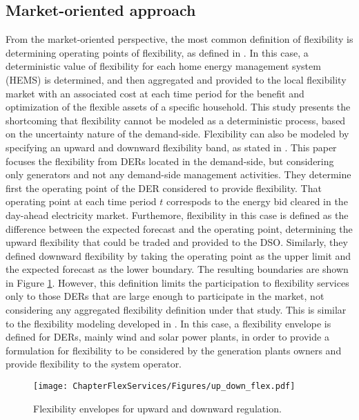 \subsection{Market-oriented approach}
From the market-oriented perspective, the most common definition of flexibility is determining operating points of flexibility, as defined in \cite{Olivella-Rosell2018}. In this case, a deterministic value of flexibility for each home energy management system (HEMS) is determined, and then aggregated and provided to the local flexibility market with an associated cost at each time period for the benefit and optimization of the flexible assets of a specific household. This study presents the shortcoming that flexibility cannot be modeled as a deterministic process, based on the uncertainty nature of the demand-side. Flexibility can also be modeled by specifying an upward and downward flexibility band, as stated in \cite{Soares2017}. This paper focuses the flexibility from DERs located in the demand-side, but considering only generators and not any demand-side management activities. They determine first the operating point of the DER considered to provide flexibility. That operating point at each time period $t$ correspods to the energy bid cleared in the day-ahead electricity market. Furthemore, flexibility in this case is defined as the difference between the expected forecast and the operating point, determining the upward flexibility that could be traded and provided to the DSO. Similarly, they defined downward flexibility by taking the operating point as the upper limit and the expected forecast as the lower boundary. The resulting boundaries are shown in Figure \ref{fig:envelopes}. However, this definition limits the participation to flexibility services only to those DERs that are large enough to participate in the market, not considering any aggregated flexibility definition under that study. This is similar to the flexibility modeling developed in \cite{Nosair2015}. In this case, a flexibility envelope is defined for DERs, mainly wind and solar power plants, in order to provide a formulation for flexibility to be considered by the generation plants owners and provide flexibility to the system operator. 

\begin{figure}[htbp]
	\centering
	\texttt{[image: ChapterFlexServices/Figures/up\_down\_flex.pdf]}
		\caption{Flexibility envelopes for upward and downward regulation.}
	\label{fig:envelopes}  
\end{figure}

